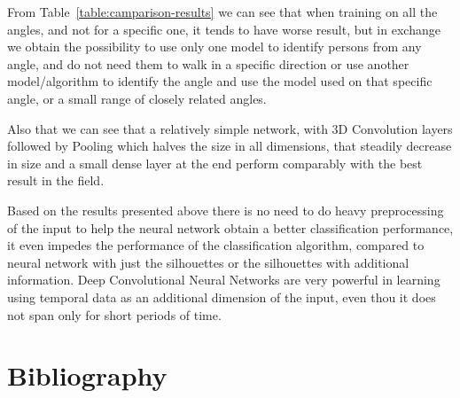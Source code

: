 \documentclass[12pt]{article}
\theoremstyle{definition}
\begin{document}
	From Table~\ref{table:camparison-results} we can see that when training on all the angles, and not for a specific one, it tends to have worse result, but in exchange we obtain the possibility to use only one model to identify persons from any angle, and do not need them to walk in a specific direction or use another model/algorithm to identify the angle and use the model used on that specific angle, or a small range of closely related angles.

	Also that we can see that a relatively simple network, with 3D Convolution layers followed by Pooling which halves the size in all dimensions, that steadily decrease in size and a small dense layer at the end perform comparably with the best result in the field.

	Based on the results presented above there is no need to do heavy preprocessing of the input to help the neural network obtain a better classification performance, it even impedes the performance of the classification algorithm, compared to neural network with just the silhouettes or the silhouettes with additional information. Deep Convolutional Neural Networks are very powerful in learning using temporal data as an additional dimension of the input, even thou it does not span only for short periods of time.

	\clearpage

	\section{Bibliography}
	
	
\end{document}
